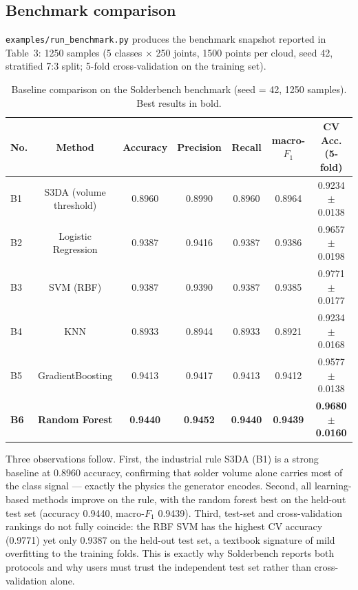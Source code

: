 \documentclass[3p]{elsarticle}
\begin{document}
\subsection{Benchmark comparison}
\texttt{examples/run\_benchmark.py} produces the benchmark snapshot reported in Table~3: 1250 samples (5 classes $\times$ 250 joints, 1500 points per cloud, seed 42, stratified 7:3 split; 5-fold cross-validation on the training set).
\begin{table}[htbp]
\centering
\caption{Baseline comparison on the Solderbench benchmark (seed = 42, 1250 samples). Best results in bold.}
\begin{tabular}{lcccccc}
\toprule
\textbf{No.} & \textbf{Method} & \textbf{Accuracy} & \textbf{Precision} & \textbf{Recall} & \textbf{macro-$F_1$} & \textbf{CV Acc. (5-fold)} \\
\midrule
B1 & S3DA (volume threshold) & 0.8960 & 0.8990 & 0.8960 & 0.8964 & 0.9234 $\pm$ 0.0138 \\
B2 & Logistic Regression & 0.9387 & 0.9416 & 0.9387 & 0.9386 & 0.9657 $\pm$ 0.0198 \\
B3 & SVM (RBF) & 0.9387 & 0.9390 & 0.9387 & 0.9385 & 0.9771 $\pm$ 0.0177 \\
B4 & KNN & 0.8933 & 0.8944 & 0.8933 & 0.8921 & 0.9234 $\pm$ 0.0168 \\
B5 & GradientBoosting & 0.9413 & 0.9417 & 0.9413 & 0.9412 & 0.9577 $\pm$ 0.0138 \\
\textbf{B6} & \textbf{Random Forest} & \textbf{0.9440} & \textbf{0.9452} & \textbf{0.9440} & \textbf{0.9439} & \textbf{0.9680 $\pm$ 0.0160} \\
\bottomrule
\end{tabular}
\end{table}
Three observations follow. First, the industrial rule S3DA (B1) is a strong baseline at 0.8960 accuracy, confirming that solder volume alone carries most of the class signal --- exactly the physics the generator encodes. Second, all learning-based methods improve on the rule, with the random forest best on the held-out test set (accuracy 0.9440, macro-$F_1$ 0.9439). Third, test-set and cross-validation rankings do not fully coincide: the RBF SVM has the highest CV accuracy (0.9771) yet only 0.9387 on the held-out test set, a textbook signature of mild overfitting to the training folds. This is exactly why Solderbench reports both protocols and why users must trust the independent test set rather than cross-validation alone.
\end{document}
